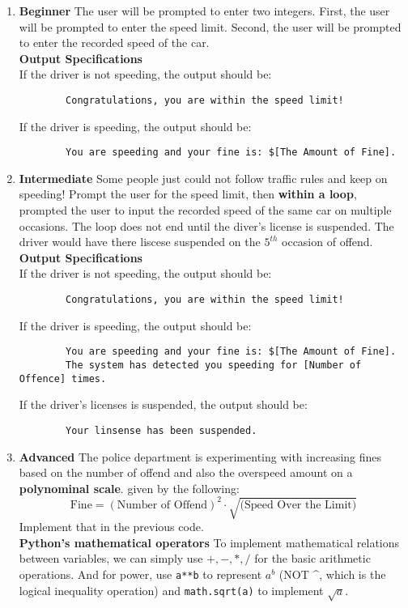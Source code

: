 \documentclass[12pt]{article}
\begin{document}
\begin{enumerate}[label=(\alph*)]
    \item \textbf{Beginner} The user will be prompted to enter two integers. First, the user will be prompted to enter the speed limit. Second, the user will be prompted to enter the recorded speed of the car.\\
    \textbf{Output Specifications}\\
    If the driver is not speeding, the output should be:
    \begin{verbatim}
        Congratulations, you are within the speed limit!
    \end{verbatim}
    If the driver is speeding, the output should be:
    \begin{verbatim}
        You are speeding and your fine is: $[The Amount of Fine].
    \end{verbatim}
    \item \textbf{Intermediate} Some people just could not follow traffic rules and keep on speeding! Prompt the user for the speed limit, then \textbf{within a loop}, prompted the user to input the recorded speed of the same car on multiple occasions. The loop does not end until the diver's license is suspended. The driver would have there liscese suspended on the $5^{th}$ occasion of offend.\\
    \textbf{Output Specifications}\\
    If the driver is not speeding, the output should be:
    \begin{verbatim}
        Congratulations, you are within the speed limit!
    \end{verbatim}
    If the driver is speeding, the output should be:
    \begin{verbatim}
        You are speeding and your fine is: $[The Amount of Fine]. 
        The system has detected you speeding for [Number of Offence] times.
    \end{verbatim}
    If the driver's licenses is suspended, the output should be:
    \begin{verbatim}
        Your linsense has been suspended.  
    \end{verbatim}
    \item \textbf{Advanced} The police department is experimenting with increasing fines based on the number of offend and also the overspeed amount on a \textbf{polynominal scale}. given by the following:
    $$
        \text{Fine} = (\text{Number of Offend})^2 \cdot \sqrt{(\text{Speed Over the Limit)}}
    $$
    Implement that in the previous code.\\
    \textbf{Python's mathematical operators} To implement mathematical relations between variables, we can simply use $+, -, *, /$ for the basic arithmetic operations. And for power, use \verb|a**b| to represent $a^b$ (NOT \^{}, which is the logical inequality operation) and \verb|math.sqrt(a)| to implement $\sqrt{a}$.
\end{enumerate}
\end{document}
